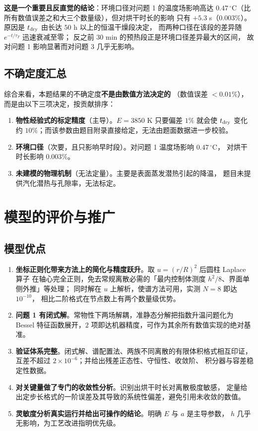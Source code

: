 \documentclass[withoutpreface,bwprint]{cumcmthesis}
\begin{document}
\textbf{这是一个重要且反直觉的结论}：环境口径对问题 1 的温度场影响高达
$0.47\,^\circ$C（比所有数值误差之和大三个数量级），但对烘干时长的影响
只有 $+5.3$ s（$0.003\%$）。原因是 $t_{\rm dry}$ 由长达 $50$ h 以上的恒温干燥段决定，
而两种口径在该段的差异随 $e^{-t/\tau_T}$ 迅速衰减至零；
反之前 $30$ min 的预热段正是环境口径差异最大的区间，
故对问题 1 影响显著而对问题 3 几乎无影响。

\subsection{不确定度汇总}

综合来看，本题结果的不确定度\textbf{不是由数值方法决定的}
（数值误差 $<0.01\%$），而是由以下三项决定，按贡献排序：

\begin{enumerate}[leftmargin=1.9em,itemsep=2pt]
\item \textbf{物性经验式的标定精度}（主导）。$E=3850$ K 只要偏差 $1\%$ 就会使
$t_{\rm dry}$ 变化约 $10\%$；而该参数由题目附录直接给定，无法由题面数据进一步校验。
\item \textbf{环境口径}（次要，且只影响早时段）。对问题 1 温度场影响 $0.47\,^\circ$C，
对烘干时长影响 $0.003\%$。
\item \textbf{未建模的物理机制}（无法定量）。主要是表面蒸发潜热引起的降温，
题目未提供汽化潜热与孔隙率，无法标定。
\end{enumerate}

\section{模型的评价与推广}
\label{sec:eval}

\subsection{模型优点}

\begin{enumerate}[leftmargin=1.9em,itemsep=2pt]
\item \textbf{坐标正则化带来方法上的简化与精度跃升}。取 $u=(r/R)^2$ 后圆柱 Laplace 算子
在轴心完全正则，免去常规离散必需的「最内控制体测度 $h^2/8$、界面单侧外推」等处理；
同时解在 $u$ 上解析，使谱方法可用，实测 $N=8$ 即达 $10^{-10}$，
相比二阶格式在节点数上有两个数量级优势。
\item \textbf{问题 1 有闭式解}。常物性下两场解耦，准静态分解把指数升温问题化为
Bessel 特征函数展开，$2$ 项即达机器精度，可作为其余所有数值实现的绝对基准。
\item \textbf{验证体系完整}。闭式解、谱配置法、两族不同离散的有限体积格式相互印证，
互差不超过 $2\times10^{-6}$；并给出残差正态性、守恒性、收敛阶、
积分器与容差稳定性数据。
\item \textbf{对关键量做了专门的收敛性分析}。识别出烘干时长对离散极度敏感，
定量给出定步长格式的一阶误差及其导致的系统性偏差，避免引用未收敛的数值。
\item \textbf{灵敏度分析真实运行并给出可操作的结论}。明确 $E$ 与 $a$ 是主导参数，
$h$ 几乎无影响，为工艺改进指明优先级。
\end{enumerate}
\end{document}
